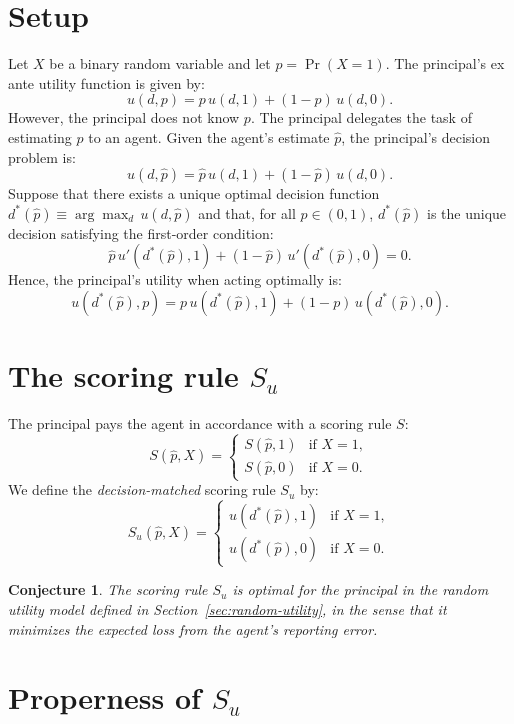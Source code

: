 \documentclass[11pt]{article}
\newtheorem{conjecture}{Conjecture}
\begin{document}
\section{Setup}
Let $X$ be a binary random variable and let $p = \Pr(X = 1)$. The principal's ex ante utility function is given by:
\[
u(d, p) = p \, u(d, 1) + (1 - p) \, u(d, 0).
\]
However, the principal does not know $p$. The principal delegates the task of estimating $p$ to an agent. Given the agent's estimate $\hat{p}$, the principal's decision problem is:
\[
u(d, \hat{p}) = \hat{p} \, u(d, 1) + (1 - \hat{p}) \, u(d, 0).
\]
Suppose that there exists a unique optimal decision function $d^*(\hat{p}) \equiv \arg\max_d \, u(d, \hat{p})$ and that, for all $\hat{p} \in (0,1)$, $d^*(\hat{p})$ is the unique decision satisfying the first-order condition:
\begin{equation}\label{eq:principal-foc}
\hat{p} \, u'(d^*(\hat{p}), 1) + (1 - \hat{p}) \, u'(d^*(\hat{p}), 0) = 0.
\end{equation}
Hence, the principal's utility when acting optimally is:
\[
u(d^*(\hat{p}), p) = p \, u(d^*(\hat{p}), 1) + (1 - p) \, u(d^*(\hat{p}), 0).
\]

\section{The scoring rule $S_u$}

The principal pays the agent in accordance with a scoring rule $S$:
\[
S(\hat{p}, X) =
\begin{cases}
S(\hat{p}, 1) & \text{if } X = 1, \\
S(\hat{p}, 0) & \text{if } X = 0.
\end{cases}
\]
We define the \emph{decision-matched} scoring rule $S_u$ by:
\[
S_u(\hat{p}, X) =
\begin{cases}
u(d^*(\hat{p}), 1) & \text{if } X = 1, \\
u(d^*(\hat{p}), 0) & \text{if } X = 0.
\end{cases}
\]

\begin{conjecture}
The scoring rule $S_u$ is optimal for the principal in the random utility model defined in Section~\ref{sec:random-utility}, in the sense that it minimizes the expected loss from the agent's reporting error.
\end{conjecture}

\section{Properness of $S_u$}
\end{document}
